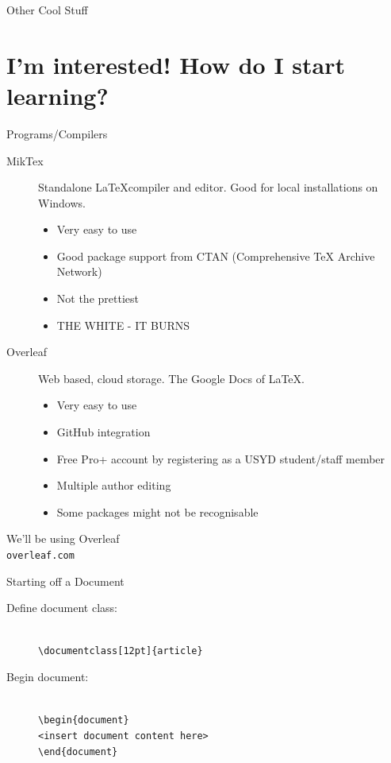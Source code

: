 \documentclass[10pt,aspectratio=169]{beamer}
\begin{document}
\begin{frame}{Other Cool Stuff}
\centering
\end{frame}
\section{I'm interested! How do I start learning?}
\begin{frame}{Programs/Compilers}
\begin{description}
\item[MikTex] Standalone \LaTeX compiler and editor. Good for local installations on Windows.
\begin{itemize}
\item Very easy to use
\item Good package support from CTAN (Comprehensive TeX Archive Network)
\item Not the prettiest
\item THE WHITE - IT BURNS
\end{itemize}
\item[Overleaf] Web based, cloud storage. The \alert{Google Docs} of \LaTeX.
\begin{itemize}
\item Very easy to use
\item GitHub integration
\item Free Pro+ account by registering as a USYD student/staff member
\item Multiple author editing
\item Some packages might not be recognisable
\end{itemize}
\end{description}
\end{frame}
\begin{frame}
  \centering
We'll be using \alert{Overleaf}\\
\texttt{overleaf.com}
\end{frame}
\begin{frame}{Starting off a Document}
\begin{description}
\item[Define document class:]\hfill\\ \vspace{0.5cm}\texttt{{\textbackslash}documentclass[12pt]\{article\}}\hfill\\ \vspace{1cm}
\item[Begin document:]\hfill\\\vspace{0.5cm}
\texttt{{\textbackslash}begin\{document\}\hfill\\
\vspace{0.5cm}
<insert document content here>\hfill\\
\vspace{0.5cm}
{\textbackslash}end\{document\}}
\end{description}
\end{frame}
\end{document}

